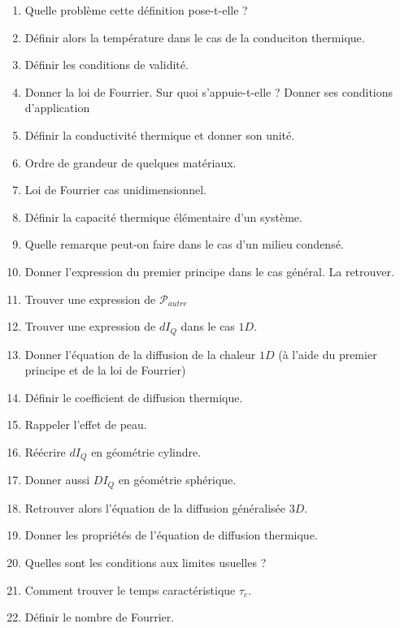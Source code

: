 \documentclass[a4paper, 11pt, hidelinks]{article}
\begin{document}
\begin{enumerate}
    \item Quelle problème cette définition pose-t-elle ? \cite{Chapitre20}
    \item Définir alors la température dans le cas de la conduciton thermique. \cite{Chapitre20}
    \item Définir les conditions de validité. \cite{Chapitre20}
    \item Donner la loi de Fourrier. Sur quoi s'appuie-t-elle ? Donner ses conditions d'application \cite{Chapitre20}
    \item Définir la conductivité thermique et donner son unité. \cite{Chapitre20}
    \item Ordre de grandeur de quelques matériaux. \cite{Chapitre20}
    \item Loi de Fourrier cas unidimensionnel. \cite{Chapitre20}
    \item Définir la capacité thermique élémentaire d'un système. \cite{Chapitre20}
    \item Quelle remarque peut-on faire dans le cas d'un milieu condensé. \cite{Chapitre20}
    \item Donner l'expression du premier principe dans le cas général. La retrouver. \cite{Chapitre20}
    \item Trouver une expression de $\mathscr{P}_{autre}$ \cite{Chapitre20}
    \item Trouver une expression de $dI_Q$ dans le cas $1D$. \cite{Chapitre20}
    \item Donner l'équation de la diffusion de la chaleur $1D$ (à l'aide du premier principe et de la loi de Fourrier) \cite{Chapitre20}
    \item Définir le coefficient de diffusion thermique. \cite{Chapitre20}
    \item Rappeler l'effet de peau. \cite{Chapitre20}
    \item Réécrire $dI_Q$ en géométrie cylindre. \cite{Chapitre20}
    \item Donner aussi $DI_Q$ en géométrie sphérique. \cite{Chapitre20}
    \item Retrouver alors l'équation de la diffusion généralisée  $3D$. \cite{Chapitre20}
    \item Donner les propriétés de l'équation de diffusion thermique. \cite{Chapitre20}
    \item Quelles sont les conditions aux limites usuelles ? \cite{Chapitre20}
    \item Comment trouver le temps caractéristique $\tau_c$. \cite{Chapitre20}
    \item Définir le nombre de Fourrier. \cite{Chapitre20}

\end{enumerate}
\end{document}
